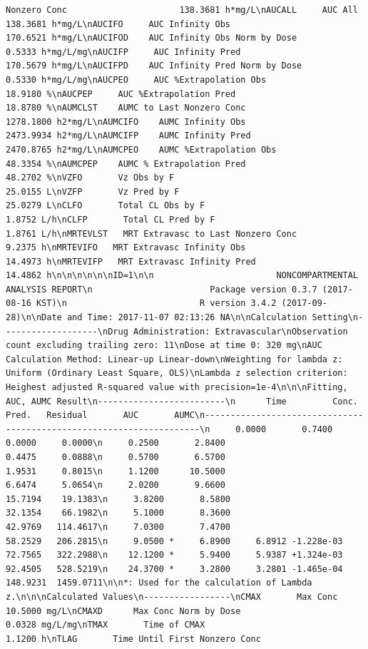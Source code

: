 \documentclass[12pt,]{krantz}
\theoremstyle{definition}
\theoremstyle{definition}
\theoremstyle{definition}
\theoremstyle{remark}
\begin{document}
\begin{verbatim}
Nonzero Conc                      138.3681 h*mg/L\nAUCALL     AUC All                                       138.3681 h*mg/L\nAUCIFO     AUC Infinity Obs                              170.6521 h*mg/L\nAUCIFOD    AUC Infinity Obs Norm by Dose                   0.5333 h*mg/L/mg\nAUCIFP     AUC Infinity Pred                             170.5679 h*mg/L\nAUCIFPD    AUC Infinity Pred Norm by Dose                  0.5330 h*mg/L/mg\nAUCPEO     AUC %Extrapolation Obs                         18.9180 %\nAUCPEP     AUC %Extrapolation Pred                        18.8780 %\nAUMCLST    AUMC to Last Nonzero Conc                    1278.1800 h2*mg/L\nAUMCIFO    AUMC Infinity Obs                            2473.9934 h2*mg/L\nAUMCIFP    AUMC Infinity Pred                           2470.8765 h2*mg/L\nAUMCPEO    AUMC %Extrapolation Obs                        48.3354 %\nAUMCPEP    AUMC % Extrapolation Pred                      48.2702 %\nVZFO       Vz Obs by F                                    25.0155 L\nVZFP       Vz Pred by F                                   25.0279 L\nCLFO       Total CL Obs by F                               1.8752 L/h\nCLFP       Total CL Pred by F                              1.8761 L/h\nMRTEVLST   MRT Extravasc to Last Nonzero Conc              9.2375 h\nMRTEVIFO   MRT Extravasc Infinity Obs                     14.4973 h\nMRTEVIFP   MRT Extravasc Infinity Pred                    14.4862 h\n\n\n\n\n\nID=1\n\n                        NONCOMPARTMENTAL ANALYSIS REPORT\n                       Package version 0.3.7 (2017-08-16 KST)\n                          R version 3.4.2 (2017-09-28)\n\nDate and Time: 2017-11-07 02:13:26 NA\n\nCalculation Setting\n-------------------\nDrug Administration: Extravascular\nObservation count excluding trailing zero: 11\nDose at time 0: 320 mg\nAUC Calculation Method: Linear-up Linear-down\nWeighting for lambda z: Uniform (Ordinary Least Square, OLS)\nLambda z selection criterion: Heighest adjusted R-squared value with precision=1e-4\n\n\nFitting, AUC, AUMC Result\n-------------------------\n      Time         Conc.      Pred.   Residual       AUC       AUMC\n---------------------------------------------------------------------\n     0.0000       0.7400                           0.0000     0.0000\n     0.2500       2.8400                           0.4475     0.0888\n     0.5700       6.5700                           1.9531     0.8015\n     1.1200      10.5000                           6.6474     5.0654\n     2.0200       9.6600                          15.7194    19.1383\n     3.8200       8.5800                          32.1354    66.1982\n     5.1000       8.3600                          42.9769   114.4617\n     7.0300       7.4700                          58.2529   206.2815\n     9.0500 *     6.8900     6.8912 -1.228e-03    72.7565   322.2988\n    12.1200 *     5.9400     5.9387 +1.324e-03    92.4505   528.5219\n    24.3700 *     3.2800     3.2801 -1.465e-04   148.9231  1459.0711\n\n*: Used for the calculation of Lambda z.\n\n\nCalculated Values\n-----------------\nCMAX       Max Conc                                       10.5000 mg/L\nCMAXD      Max Conc Norm by Dose                           0.0328 mg/L/mg\nTMAX       Time of CMAX                                    1.1200 h\nTLAG       Time Until First Nonzero Conc             
\end{verbatim}
\end{document}
